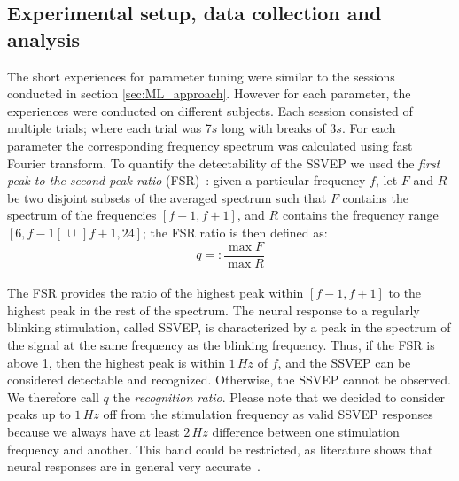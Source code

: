 \documentclass[smallextended]{svjour3}
\begin{document}
\subsection{Experimental setup, data collection and analysis}
The short experiences for parameter tuning were similar to the sessions conducted in section \ref{sec:ML_approach}. However for each parameter, the experiences were conducted on different subjects. Each session consisted of multiple trials; where each trial was 7$s$ long with breaks of 3$s$. For each parameter the corresponding frequency spectrum was calculated using fast Fourier transform. 
To quantify the detectability of the SSVEP we used the \textit{first peak to the second peak ratio} (FSR)~\cite{Zheng2010}:
given a particular frequency $f$, let $F$ and $R$ be two disjoint subsets of the averaged spectrum such that $F$ contains the spectrum of the frequencies $[f-1, f+1]$, and $R$ contains the frequency range $[6, f-1[ \,\cup\, ]f+1, 24]$; the FSR ratio is then defined as:
\begin{equation}
\label{recog_rat}
q =:\frac{\max F}{\max R}
\end{equation}
\\
The FSR provides the ratio of the highest peak within $[f-1, f+1]$ to the highest peak in the rest of the spectrum. The neural response to a regularly blinking stimulation, called SSVEP, is characterized by a peak in the spectrum of the signal at the same frequency as the blinking frequency. Thus, if the FSR is above 1, then the highest peak is within $1\,\mathit{Hz}$ of $f$, and the SSVEP can be considered detectable and recognized. 
Otherwise, the SSVEP cannot be observed. 
We therefore call $q$ the \textit{recognition ratio}.
Please note that we decided to consider peaks up to $1\,\mathit{Hz}$ off from the stimulation frequency as valid SSVEP responses because we always have at least $2\,\mathit{Hz}$ difference between one stimulation frequency and another. This band could be restricted, as literature shows that neural responses are in general very accurate~\cite{SSVEPfiability}.
\end{document}

